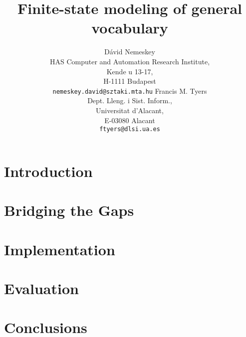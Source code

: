\documentclass{article}
\title{Finite-state modeling of general vocabulary}
\author{D\'avid Nemeskey\\
 HAS Computer and Automation Research Institute, \\
   Kende u 13-17, \\
   H-1111 Budapest\\
 {\tt nemeskey.david@sztaki.mta.hu}
\And
Francis M. Tyers\\
Dept. Lleng. i Sist. Inform.,\\
Universitat d'Alacant,\\
E-03080 Alacant\\
{\tt ftyers@dlsi.ua.es}}
\date{}
\begin{document}
\maketitle\vspace*{-10mm}

\begin{abstract}
\end{abstract}

\section{Introduction}

\section{Bridging the Gaps}
\label{sec:bridging}

\section{Implementation}
\label{sec:implementation}

\section{Evaluation}
\label{sec:evaluation}

\section{Conclusions}
\label{sec:conclusion}

\cite{Karlsson:1990} %
\cite{Hulden:2011} %
\cite{Peltonen:2011} %
\cite{Tapanainen:1996} %



\end{document}
